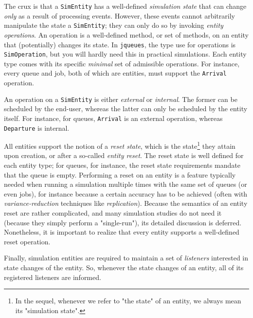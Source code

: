 The crux is that a \lstinline|SimEntity|
  has a well-defined {\em simulation state\/}
  that can change
  {\em only\/} as a result of processing events.
However, these events cannot arbitrarily manipulate
  the state a \lstinline|SimEntity|;
  they can only do so by invoking
  {\em entity operations}.
An operation is a well-defined method, or set of methods,
  on an entity that (potentially) changes its state.
In \lstinline|jqueues|,
  the type use for operations is \lstinline|SimOperation|,
  but you will hardly need this in practical simulations.
Each entity type comes with its specific
  {\em minimal\/} set of admissible operations.
For instance, every queue and job,
  both of which are entities,
  must support the \lstinline|Arrival| operation.

An operation on a \lstinline|SimEntity| is either
  {\em external\/} or {\em internal}.
The former can be scheduled by the end-user,
  whereas the latter can only be scheduled by the entity itself.
For instance,
  for queues, \lstinline|Arrival| is an external operation,
  whereas \lstinline|Departure| is internal.

All entities support the notion of a {\em reset state},
  which is the state\footnote{In the sequel,
  whenever we refer to "the state" of an entity,
  we always mean its "simulation state".}
  they attain upon creation,
  or after a so-called {\em entity reset}.
The reset state is well defined for each entity type;
  for queues, for instance,
  the reset state requirements mandate that the queue is empty.
Performing a reset on an entity is a feature typically needed
  when running a simulation multiple times with the same set of queues
  (or even jobs),
  for instance because a certain accuracy has to be achieved
  (often with {\em variance-reduction\/} techniques like {\em replication\/}).
Because the semantics of an entity reset are rather complicated,
  and many simulation studies do not need it
  (because they simply perform a "single-run"),
  its detailed discussion is deferred.
Nonetheless,
  it is important to realize that every entity
  supports a well-defined reset operation.

Finally, simulation entities are required to
  maintain a set of {\em listeners\/}
  interested in state changes of the entity.
So, whenever the state changes of an entity,
  all of its registered listeners
  are informed.

